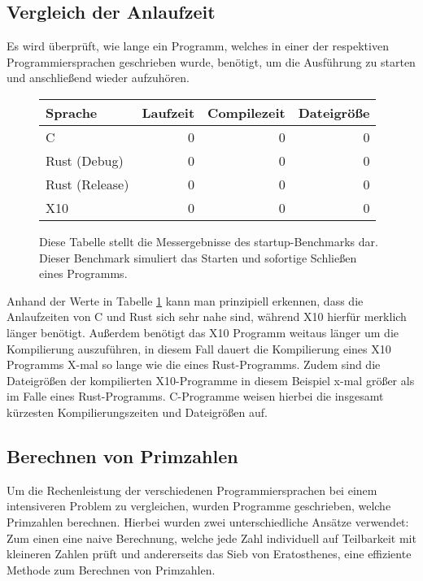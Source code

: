 \subsection{Vergleich der Anlaufzeit}

Es wird überprüft, wie lange ein Programm, welches in einer der respektiven Programmiersprachen geschrieben wurde,
benötigt, um die Ausführung zu starten und anschließend wieder aufzuhören.

\begin{figure}[hb]
	\begin{center}
		\begin{tabular}{lrrr}
			\toprule
			Sprache & Laufzeit & Compilezeit & Dateigröße \\
			\midrule
			C & 0 & 0 & 0 \\
			Rust (Debug) & 0 & 0 & 0 \\
			Rust (Release) & 0 & 0 & 0 \\
			X10 & 0 & 0 & 0 \\
			\bottomrule
		\end{tabular}
	\end{center}
	\caption{
		Diese Tabelle stellt die Messergebnisse des startup-Benchmarks dar. Dieser Benchmark simuliert das Starten und sofortige
		Schließen eines Programms.
	}
	\label{fig:startup_table}
\end{figure}

Anhand der Werte in Tabelle \ref{fig:startup_table} kann man prinzipiell erkennen, dass die Anlaufzeiten von C und Rust sich sehr nahe
sind, während X10 hierfür merklich länger benötigt.
Außerdem benötigt das X10 Programm weitaus länger um die Kompilierung auszuführen, in diesem Fall dauert die Kompilierung eines
X10 Programms X-mal so lange wie die eines Rust-Programms.
Zudem sind die Dateigrößen der kompilierten X10-Programme in diesem Beispiel x-mal größer als im Falle eines Rust-Programms.
C-Programme weisen hierbei die insgesamt kürzesten Kompilierungszeiten und Dateigrößen auf.

\subsection{Berechnen von Primzahlen}

Um die Rechenleistung der verschiedenen Programmiersprachen bei einem intensiveren Problem zu vergleichen, wurden
Programme geschrieben, welche Primzahlen berechnen. Hierbei wurden zwei unterschiedliche Ansätze verwendet: Zum einen
eine naive Berechnung, welche jede Zahl individuell auf Teilbarkeit mit kleineren Zahlen prüft und andererseits
das Sieb von Eratosthenes, eine effiziente Methode zum Berechnen von Primzahlen.

